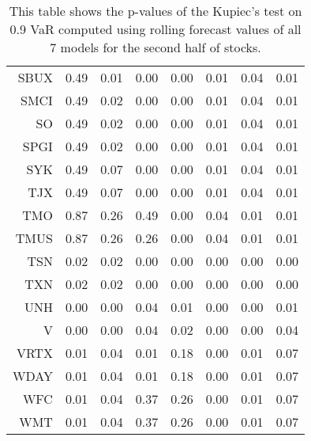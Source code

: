\begin{table}[ht]
\begin{tabular}{rrrrrrrr}
  SBUX & 0.49 & 0.01 & 0.00 & 0.00 & 0.01 & 0.04 & 0.01 \\ 
  SMCI & 0.49 & 0.02 & 0.00 & 0.00 & 0.01 & 0.04 & 0.01 \\ 
  SO & 0.49 & 0.02 & 0.00 & 0.00 & 0.01 & 0.04 & 0.01 \\ 
  SPGI & 0.49 & 0.02 & 0.00 & 0.00 & 0.01 & 0.04 & 0.01 \\ 
  SYK & 0.49 & 0.07 & 0.00 & 0.00 & 0.01 & 0.04 & 0.01 \\ 
  TJX & 0.49 & 0.07 & 0.00 & 0.00 & 0.01 & 0.04 & 0.01 \\ 
  TMO & 0.87 & 0.26 & 0.49 & 0.00 & 0.04 & 0.01 & 0.01 \\ 
  TMUS & 0.87 & 0.26 & 0.26 & 0.00 & 0.04 & 0.01 & 0.01 \\ 
  TSN & 0.02 & 0.02 & 0.00 & 0.00 & 0.00 & 0.00 & 0.00 \\ 
  TXN & 0.02 & 0.02 & 0.00 & 0.00 & 0.00 & 0.00 & 0.00 \\ 
  UNH & 0.00 & 0.00 & 0.04 & 0.01 & 0.00 & 0.00 & 0.01 \\ 
  V & 0.00 & 0.00 & 0.04 & 0.02 & 0.00 & 0.00 & 0.04 \\ 
  VRTX & 0.01 & 0.04 & 0.01 & 0.18 & 0.00 & 0.01 & 0.07 \\ 
  WDAY & 0.01 & 0.04 & 0.01 & 0.18 & 0.00 & 0.01 & 0.07 \\ 
  WFC & 0.01 & 0.04 & 0.37 & 0.26 & 0.00 & 0.01 & 0.07 \\ 
  WMT & 0.01 & 0.04 & 0.37 & 0.26 & 0.00 & 0.01 & 0.07 \\ 
   \hline
\end{tabular}
\caption[Kupiec's test p-values, alpha =0.9 (2)]{This table shows the p-values of the Kupiec's test on 0.9 VaR computed using rolling forecast values of all 7 models for the second half of stocks.} 
\label{Table:Kupiec_test_rolling_0.9_2}
\end{table}
